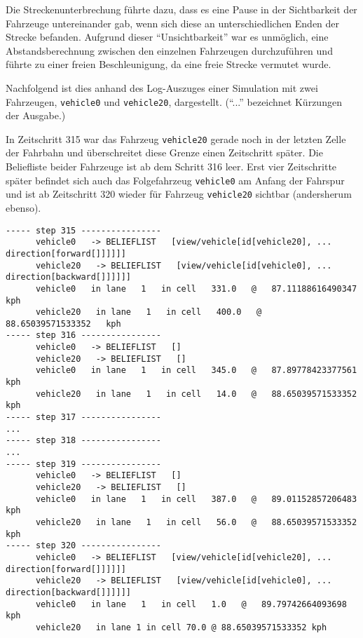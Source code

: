 Die Streckenunterbrechung führte dazu, dass es eine Pause in der Sichtbarkeit der Fahrzeuge untereinander gab, wenn sich diese an unterschiedlichen Enden der Strecke befanden.
Aufgrund dieser \enquote{Unsichtbarkeit} war es unmöglich, eine Abstandsberechnung zwischen den einzelnen Fahrzeugen durchzuführen und führte zu einer freien Beschleunigung, da eine freie Strecke vermutet wurde.

Nachfolgend ist dies anhand des Log-Auszuges einer Simulation mit zwei Fahrzeugen, \texttt{vehicle0} und \texttt{vehicle20}, dargestellt. 
(\enquote{...} bezeichnet Kürzungen der Ausgabe.)

In Zeitschritt 315 war das Fahrzeug \texttt{vehicle20} gerade noch in der letzten Zelle der Fahrbahn und überschreitet diese Grenze einen Zeitschritt später.
Die Beliefliste beider Fahrzeuge ist ab dem Schritt 316 leer.
Erst vier Zeitschritte später befindet sich auch das Folgefahrzeug \texttt{vehicle0} am Anfang der Fahrspur und ist ab Zeitschritt 320 wieder für Fahrzeug \texttt{vehicle20} sichtbar (andersherum ebenso).

\footnotesize\begin{verbatim}
----- step 315 ----------------
      vehicle0   -> BELIEFLIST   [view/vehicle[id[vehicle20], ... direction[forward[]]]]]]
      vehicle20   -> BELIEFLIST   [view/vehicle[id[vehicle0], ... direction[backward[]]]]]]
      vehicle0   in lane   1   in cell   331.0   @   87.11188616490347   kph
      vehicle20   in lane   1   in cell   400.0   @   88.65039571533352   kph
----- step 316 ----------------
      vehicle0   -> BELIEFLIST   []
      vehicle20   -> BELIEFLIST   []
      vehicle0   in lane   1   in cell   345.0   @   87.89778423377561   kph
      vehicle20   in lane   1   in cell   14.0   @   88.65039571533352   kph
----- step 317 ----------------
...
----- step 318 ----------------
...
----- step 319 ----------------
      vehicle0   -> BELIEFLIST   []
      vehicle20   -> BELIEFLIST   []
      vehicle0   in lane   1   in cell   387.0   @   89.01152857206483   kph
      vehicle20   in lane   1   in cell   56.0   @   88.65039571533352   kph
----- step 320 ----------------
      vehicle0   -> BELIEFLIST   [view/vehicle[id[vehicle20], ... direction[forward[]]]]]]
      vehicle20   -> BELIEFLIST   [view/vehicle[id[vehicle0], ... direction[backward[]]]]]]
      vehicle0   in lane   1   in cell   1.0   @   89.79742664093698   kph
      vehicle20   in lane 1 in cell 70.0 @ 88.65039571533352 kph
\end{verbatim}
\normalsize

